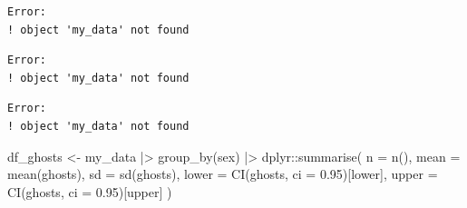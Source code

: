 \documentclass[
  letterpaper,
  DIV=11,
  numbers=noendperiod]{scrartcl}
\newenvironment{Shaded}{\begin{snugshade}}{\end{snugshade}}
\newcommand{\AttributeTok}[1]{\textcolor[rgb]{0.40,0.45,0.13}{#1}}
\newcommand{\FloatTok}[1]{\textcolor[rgb]{0.68,0.00,0.00}{#1}}
\newcommand{\FunctionTok}[1]{\textcolor[rgb]{0.28,0.35,0.67}{#1}}
\newcommand{\NormalTok}[1]{\textcolor[rgb]{0.00,0.23,0.31}{#1}}
\newcommand{\OtherTok}[1]{\textcolor[rgb]{0.00,0.23,0.31}{#1}}
\newcommand{\SpecialCharTok}[1]{\textcolor[rgb]{0.37,0.37,0.37}{#1}}
\newcommand{\StringTok}[1]{\textcolor[rgb]{0.13,0.47,0.30}{#1}}
\begin{document}
\begin{Shaded}
\end{Shaded}

\begin{verbatim}
Error:
! object 'my_data' not found
\end{verbatim}

\begin{Shaded}
\end{Shaded}

\begin{verbatim}
Error:
! object 'my_data' not found
\end{verbatim}

\begin{Shaded}
\end{Shaded}

\begin{verbatim}
Error:
! object 'my_data' not found
\end{verbatim}

\begin{Shaded}
\begin{Highlighting}[]
\NormalTok{df\_ghosts }\OtherTok{\textless{}{-}}\NormalTok{ my\_data }\SpecialCharTok{|\textgreater{}}
  \FunctionTok{group\_by}\NormalTok{(sex) }\SpecialCharTok{|\textgreater{}}
\NormalTok{  dplyr}\SpecialCharTok{::}\FunctionTok{summarise}\NormalTok{(}
    \AttributeTok{n =} \FunctionTok{n}\NormalTok{(),}
    \AttributeTok{mean =} \FunctionTok{mean}\NormalTok{(ghosts),}
    \AttributeTok{sd =} \FunctionTok{sd}\NormalTok{(ghosts),}
    \AttributeTok{lower =} \FunctionTok{CI}\NormalTok{(ghosts, }\AttributeTok{ci =} \FloatTok{0.95}\NormalTok{)[}\StringTok{\textquotesingle{}lower\textquotesingle{}}\NormalTok{],}
    \AttributeTok{upper  =} \FunctionTok{CI}\NormalTok{(ghosts, }\AttributeTok{ci =} \FloatTok{0.95}\NormalTok{)[}\StringTok{\textquotesingle{}upper\textquotesingle{}}\NormalTok{]}
\NormalTok{    )}
\end{Highlighting}
\end{Shaded}
\end{document}
